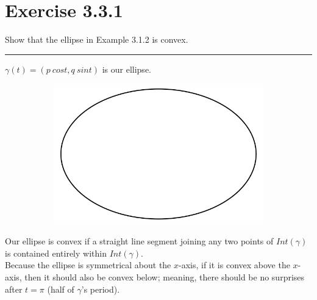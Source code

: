 \documentclass[12pt]{article}
\begin{document}
\maketitle

\section*{Exercise 3.3.1}

Show that the ellipse in Example 3.1.2 is convex.

\vspace{1cm}
\hrule
\vspace{1cm}
$\gamma(t) = (p \ cost, q \ sint)$ is our ellipse.

\begin{figure}[h!]
  \centering
      \begin{subfigure}[b]{0.5\linewidth}
    \includegraphics[width=\linewidth]{./assets/3-3-1/ellipse.png}
  \end{subfigure}
  \end{figure}
  
Our ellipse is convex if a straight line segment joining any two points of $Int(\gamma)$ is contained entirely within $Int(\gamma)$.\\

\indent
Because the ellipse is symmetrical about the $x$-axis, if it is convex above the $x$-axis, then it should also be convex below; meaning, there should be no surprises after $t = \pi$ (half of $\gamma$'s period).
\end{document}
